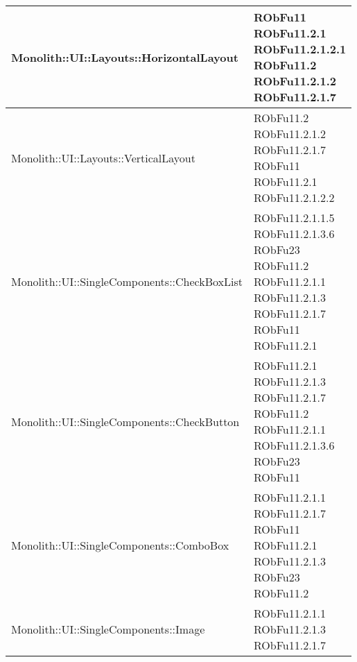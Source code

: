 \begin{center}
\begin{longtable}{|
*{1}{>{\centering\arraybackslash}m{7.5cm}|}
*{1}{>{\centering\arraybackslash}m{2.5cm}|}}
Monolith::UI::Layouts::HorizontalLayout & \makecell{RObFu11
\\RObFu11.2.1
\\RObFu11.2.1.2.1
\\RObFu11.2
\\RObFu11.2.1.2
\\RObFu11.2.1.7
\\}\\\hline
Monolith::UI::Layouts::VerticalLayout & \makecell{RObFu11.2
\\RObFu11.2.1.2
\\RObFu11.2.1.7
\\RObFu11
\\RObFu11.2.1
\\RObFu11.2.1.2.2
\\}\\\hline
Monolith::UI::SingleComponents::CheckBoxList & \makecell{RObFu11.2.1.1.5
\\RObFu11.2.1.3.6
\\RObFu23
\\RObFu11.2
\\RObFu11.2.1.1
\\RObFu11.2.1.3
\\RObFu11.2.1.7
\\RObFu11
\\RObFu11.2.1
\\}\\\hline
Monolith::UI::SingleComponents::CheckButton & \makecell{RObFu11.2.1
\\RObFu11.2.1.3
\\RObFu11.2.1.7
\\RObFu11.2
\\RObFu11.2.1.1
\\RObFu11.2.1.3.6
\\RObFu23
\\RObFu11
\\}\\\hline
Monolith::UI::SingleComponents::ComboBox & \makecell{RObFu11.2.1.1
\\RObFu11.2.1.7
\\RObFu11
\\RObFu11.2.1
\\RObFu11.2.1.3
\\RObFu23
\\RObFu11.2
\\}\\\hline
Monolith::UI::SingleComponents::Image & \makecell{RObFu11.2.1.1
\\RObFu11.2.1.3
\\RObFu11.2.1.7
}
\end{longtable}
\end{center}
